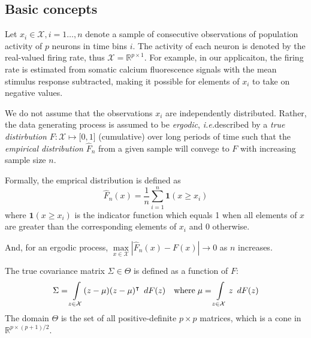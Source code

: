 \subsection{Basic concepts}
Let $x_i \in \mathcal X, i=1\ldots,n$ denote a sample of consecutive observations of population activity of $p$ neurons in time bins $i$.  
The activity of each neuron is denoted by the real-valued firing rate, thus  $\mathcal X = \mathbb R^{p\times 1}$.  
For example, in our applicaiton, the firing rate is estimated from somatic calcium fluorescence signals with the mean stimulus response subtracted, making it possible for elements of $x_i$ to take on negative values. 

We do not assume that the observations $x_i$ are independently distributed. Rather, the data generating process is assumed to be \emph{ergodic}, \emph{i.e.}\;described by a \emph{true distirbution} $F: \mathcal X \mapsto  \mathbb [0, 1]$ (cumulative) over long periods of time such that the \emph{empirical distribution} $\hat F_n$ from a given sample will convege to $F$ with increasing sample size $n$.

Formally, the emprical distribution is defined as 
\begin{equation}
\hat F_n(x) = \frac 1 n \sum\limits_{i=1}^n \mathbf{1}(x \ge x_i)
\end{equation}
where $\mathbf 1(x \ge x_i)$ is the indicator function which equals 1 when all elements of $x$ are greater than the corresponding elements of $x_i$ and 0 otherwise. 

And, for an ergodic process, $\max\limits_{x\in\mathcal X} \left|\hat F_n(x) - F(x)\right| \to 0$ as $n$ increases.

The true covariance matrix $\Sigma \in \Theta$ is defined as a function of $F$:
\begin{equation}
\Sigma = \int\limits_{z\in\mathcal X} (z - \mu)(z - \mu)^\intercal \mathop{}\,d F(z)
\quad\mbox{where}\;
\mu = \int\limits_{z\in\mathcal X} z \mathop{}\,d F(z)
\end{equation}
The domain $\Theta$ is the set of all positive-definite $p\times p$ matrices, which is a cone in $\mathbb R^{p\times(p+1)/2}$.

